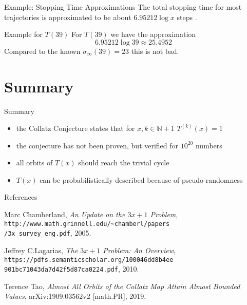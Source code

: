 \documentclass[hyperref={colorlinks,allcolors=black}]{beamer}
\begin{document}

\begin{frame}{Example: Stopping Time Approximations}
The total stopping time for most trajectories is approximated to be about 
$6.95212 \log x$ steps \cite{src:lagarias}.
\begin{block}{Example for $T(39)$}
For $T(39)$ we have the approximation
\begin{equation}\nonumber
    6.95212 \log 39 \approx 25.4952
\end{equation}
Compared to the known $\sigma_{\infty}(39)=23$ this is not bad.
\end{block}
\end{frame}


\section{Summary}

\begin{frame}{Summary}
\begin{itemize}
    \item the Collatz Conjecture states that for $x,k \in \mathbb{N} + 1$
        $T^{(k)}(x)=1$
    \item the conjecture has not been proven, but verified for $10^{20}$
        numbers
    \item all orbits of $T(x)$ should reach the trivial cycle
    \item $T(x)$ can be probabilistically described because of pseudo-randomness
\end{itemize}
\end{frame}



\begin{frame}{References}
\begin{thebibliography}{4}

 Marc Chamberland, 
    \textit{An Update on the $3x+1$ Problem},
        \texttt{http://www.math.grinnell.edu/\~{}chamberl/papers\\
        /3x\_survey\_eng.pdf},
    2005.

 Jeffrey C.Lagarias, 
    \textit{The $3x+1$ Problem: An Overview},
    \texttt{https://pdfs.semanticscholar.org/100046dd8b4ee\\
        901bc71043da7d42f5d87ca0224.pdf},
    2010.

 Terence Tao, \textit{Almost All Orbits of the Collatz Map Attain
    Almost Bounded Values}, arXiv:1909.03562v2 [math.PR], 2019.

\end{thebibliography}
\end{frame}
\end{document}
